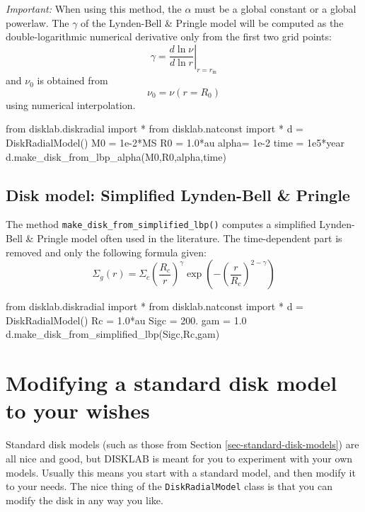 \documentclass{book}
\newcommand{\code}[1]{{\small\tt #1}}
\begin{document}
{\em Important:} When using this method, the $\alpha$ must be a global constant
or a global powerlaw. The $\gamma$ of the Lynden-Bell \& Pringle model will
be computed as the double-logarithmic numerical derivative
only from the first two grid points:
\begin{equation}
\gamma =\left.\frac{d\ln\nu}{d\ln r}\right|_{r=r_{\mathrm{in}}}
\end{equation}
and $\nu_0$ is obtained from
\begin{equation}
\nu_0 = \nu(r=R_0)
\end{equation}
using numerical interpolation.
\begin{codebox}
from disklab.diskradial import *
from disklab.natconst import *
d    = DiskRadialModel()
M0   = 1e-2*MS
R0   = 1.0*au
alpha= 1e-2
time = 1e5*year
d.make_disk_from_lbp_alpha(M0,R0,alpha,time)
\end{codebox}

\subsection{Disk model: Simplified Lynden-Bell \& Pringle}
The method \code{make\_disk\_from\_simplified\_lbp()} computes a simplified
Lynden-Bell \& Pringle model often used in the literature.
The time-dependent part is removed and only the following formula given:
\begin{equation}
\Sigma_g(r) = \Sigma_c \left(\frac{R_c}{r}\right)^\gamma \exp\left(-\left(\frac{r}{R_c}\right)^{2-\gamma}\right)
\end{equation}
\begin{codebox}
from disklab.diskradial import *
from disklab.natconst import *
d    = DiskRadialModel()
Rc   = 1.0*au
Sigc = 200.
gam  = 1.0
d.make_disk_from_simplified_lbp(Sigc,Rc,gam)
\end{codebox}

\section{Modifying a standard disk model to your wishes}
Standard disk models (such as those from Section \ref{sec-standard-disk-models})
are all nice and good, but {\sf DISKLAB} is meant for you to experiment with
your own models. Usually this means you start with a standard model, and then
modify it to your needs. The nice thing of the \code{DiskRadialModel} class is that
you can modify the disk in any way you like.
\end{document}
